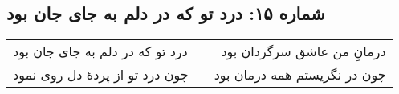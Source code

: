 \begin{center}
\section*{شماره ۱۵: درد تو که در دلم به جای جان بود}
\label{sec:015}
\begin{longtable}{l p{0.5cm} r}
درد تو که در دلم به جای جان بود
&&
درمانِ من عاشق سرگردان بود
\\
چون درد تو از پردهٔ دل روی نمود
&&
چون در نگریستم همه درمان بود
\\
\end{longtable}
\end{center}
